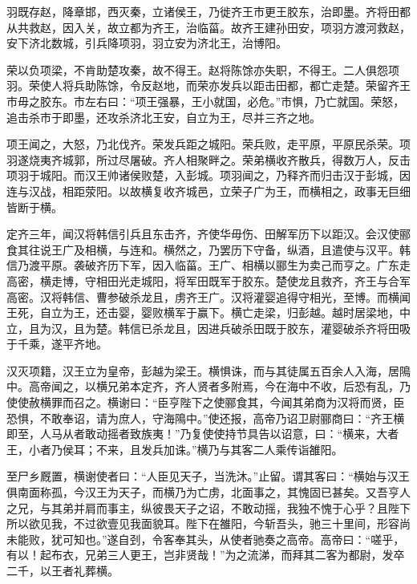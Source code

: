 \documentclass[12pt,UTF8]{ctexbook}
\begin{document}
羽既存赵，降章邯，西灭秦，立诸侯王，乃徙齐王市更王胶东，治即墨。齐将田都从共救赵，因入关，故立都为齐王，治临菑。故齐王建孙田安，项羽方渡河救赵，安下济北数城，引兵降项羽，羽立安为济北王，治博阳。



荣以负项梁，不肯助楚攻秦，故不得王。赵将陈馀亦失职，不得王。二人俱怨项羽。荣使人将兵助陈馀，令反赵地，而荣亦发兵以距击田都，都亡走楚。荣留齐王市毋之胶东。市左右曰：“项王强暴，王小就国，必危。”市惧，乃亡就国。荣怒，追击杀市于即墨，还攻杀济北王安，自立为王，尽并三齐之地。



项王闻之，大怒，乃北伐齐。荣发兵距之城阳。荣兵败，走平原，平原民杀荣。项羽遂烧夷齐城郭，所过尽屠破。齐人相聚畔之。荣弟横收齐散兵，得数万人，反击项羽于城阳。而汉王帅诸侯败楚，入彭城。项羽闻之，乃释齐而归击汉于彭城，因连与汉战，相距荥阳。以故横复收齐城邑，立荣子广为王，而横相之，政事无巨细皆断于横。



定齐三年，闻汉将韩信引兵且东击齐，齐使华毋伤、田解军历下以距汉。会汉使郦食其往说王广及相横，与连和。横然之，乃罢历下守备，纵酒，且遣使与汉平。韩信乃渡平原。袭破齐历下军，因入临菑。王广、相横以郦生为卖己而亨之。广东走高密，横走博，守相田光走城阳，将军田既军于胶东。楚使龙且救齐，齐王与合军高密。汉将韩信、曹参破杀龙且，虏齐王广。汉将灌婴追得守相光，至博。而横闻王死，自立为王，还击婴，婴败横军于赢下。横亡走梁，归彭越。越时居梁地，中立，且为汉，且为楚。韩信已杀龙且，因进兵破杀田既于胶东，灌婴破杀齐将田吸于千乘，遂平齐地。



汉灭项籍，汉王立为皇帝，彭越为梁王。横惧诛，而与其徒属五百余人入海，居隝中。高帝闻之，以横兄弟本定齐，齐人贤者多附焉，今在海中不收，后恐有乱，乃使使赦横罪而召之。横谢曰：“臣亨陛下之使郦食其，今闻其弟商为汉将而贤，臣恐惧，不敢奉诏，请为庶人，守海隝中。”使还报，高帝乃诏卫尉郦商曰：“齐王横即至，人马从者敢动摇者致族夷！”乃复使使持节具告以诏意，曰：“横来，大者王，小者乃侯耳；不来，且发兵加诛。”横乃与其客二人乘传诣雒阳。



至尸乡厩置，横谢使者曰：“人臣见天子，当洗沐。”止留。谓其客曰：“横始与汉王俱南面称孤，今汉王为天子，而横乃为亡虏，北面事之，其愧固已甚矣。又吾亨人之兄，与其弟并肩而事主，纵彼畏天子之诏，不敢动摇，我独不愧于心乎？且陛下所以欲见我，不过欲壹见我面貌耳。陛下在雒阳，今斩吾头，驰三十里间，形容尚未能败，犹可知也。”遂自刭，令客奉其头，从使者驰奏之高帝。高帝曰：“嗟乎，有以！起布衣，兄弟三人更王，岂非贤哉！”为之流涕，而拜其二客为都尉，发卒二千，以王者礼葬横。
\end{document}
